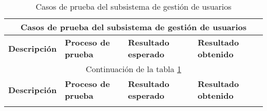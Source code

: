 \begin{landscape}
	\begin{longtable}[c]{|p{50mm}|p{50mm}|p{50mm}|p{50mm}|}
	 \caption{Casos de prueba del subsistema de gestión de usuarios\label{table:casos_prueba_usuarios}}\\
	
	 \hline
	 \multicolumn{4}{|c|}{\textbf{Casos de prueba del subsistema de gestión de usuarios}}\\
	 \hline
	 \textbf{Descripción} & \textbf{Proceso de prueba} & \textbf{Resultado esperado} & \textbf{Resultado obtenido}\\
	 \hline
	 \hline
	 \endfirsthead
	 
	 \hline
	 \multicolumn{4}{|c|}{Continuación de la tabla \ref{table:casos_prueba_usuarios}}\\
	 \hline
	 \textbf{Descripción} & \textbf{Proceso de prueba} & \textbf{Resultado esperado} & \textbf{Resultado obtenido}\\
	 \hline
	 \hline
	 \endhead
	 
	 \hline
	 \endfoot
	 

\end{longtable}
\end{landscape}
